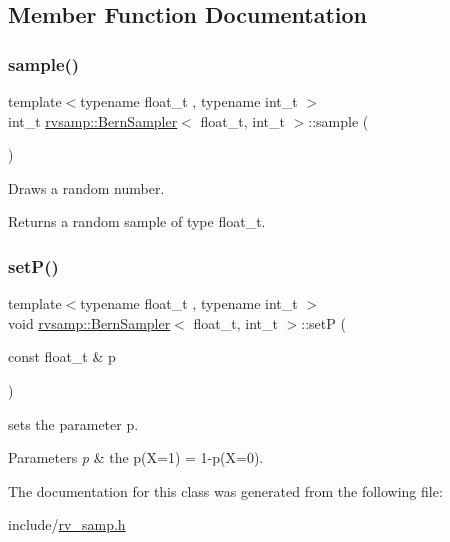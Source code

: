 \subsection{Member Function Documentation}
\mbox{\label{classrvsamp_1_1BernSampler_a2520daff5a896b58073d6756758d1323}} 
\subsubsection{\texorpdfstring{sample()}{sample()}}
{\footnotesize\ttfamily template$<$typename float\+\_\+t , typename int\+\_\+t $>$ \\
int\+\_\+t \hyperlink{classrvsamp_1_1BernSampler}{rvsamp\+::\+Bern\+Sampler}$<$ float\+\_\+t, int\+\_\+t $>$\+::sample (\begin{DoxyParamCaption}{ }\end{DoxyParamCaption})}



Draws a random number. 

\begin{DoxyReturn}{Returns}
a random sample of type float\+\_\+t. 
\end{DoxyReturn}
\mbox{\label{classrvsamp_1_1BernSampler_ab61c1b21be5d7422fec4ea95be91c8cc}} 
\subsubsection{\texorpdfstring{set\+P()}{setP()}}
{\footnotesize\ttfamily template$<$typename float\+\_\+t , typename int\+\_\+t $>$ \\
void \hyperlink{classrvsamp_1_1BernSampler}{rvsamp\+::\+Bern\+Sampler}$<$ float\+\_\+t, int\+\_\+t $>$\+::setP (\begin{DoxyParamCaption}\item[{const float\+\_\+t \&}]{p }\end{DoxyParamCaption})}



sets the parameter p. 


\begin{DoxyParams}{Parameters}
{\em p} & the p(X=1) = 1-\/p(X=0). \\
\hline
\end{DoxyParams}


The documentation for this class was generated from the following file\+:\begin{DoxyCompactItemize}
\item 
include/\hyperlink{rv__samp_8h}{rv\+\_\+samp.\+h}\end{DoxyCompactItemize}
